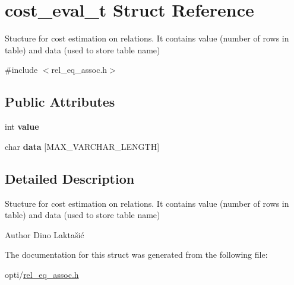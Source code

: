 \hypertarget{structcost__eval__t}{\section{cost\+\_\+eval\+\_\+t Struct Reference}
\label{structcost__eval__t}
}


Stucture for cost estimation on relations. It contains value (number of rows in table) and data (used to store table name)  




{\ttfamily \#include $<$rel\+\_\+eq\+\_\+assoc.\+h$>$}

\subsection*{Public Attributes}
\begin{DoxyCompactItemize}
\item 
\hypertarget{structcost__eval__t_ab6682b6adcf408d8d22ed0b7f03ca5d9}{int {\bfseries value}}\label{structcost__eval__t_ab6682b6adcf408d8d22ed0b7f03ca5d9}

\item 
\hypertarget{structcost__eval__t_ad33dd7ac629ddfbacc965bc1cf5f07ac}{char {\bfseries data} \mbox{[}M\+A\+X\+\_\+\+V\+A\+R\+C\+H\+A\+R\+\_\+\+L\+E\+N\+G\+T\+H\mbox{]}}\label{structcost__eval__t_ad33dd7ac629ddfbacc965bc1cf5f07ac}

\end{DoxyCompactItemize}


\subsection{Detailed Description}
Stucture for cost estimation on relations. It contains value (number of rows in table) and data (used to store table name) 

\begin{DoxyAuthor}{Author}
Dino Laktašić 
\end{DoxyAuthor}


The documentation for this struct was generated from the following file\+:\begin{DoxyCompactItemize}
\item 
opti/\hyperlink{rel__eq__assoc_8h}{rel\+\_\+eq\+\_\+assoc.\+h}\end{DoxyCompactItemize}

